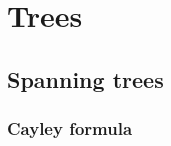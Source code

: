 \documentclass[main]{subfiles}
\begin{document}

\section{Trees}

\subsection{Spanning trees}

\subsubsection{Cayley formula}

\end{document}
